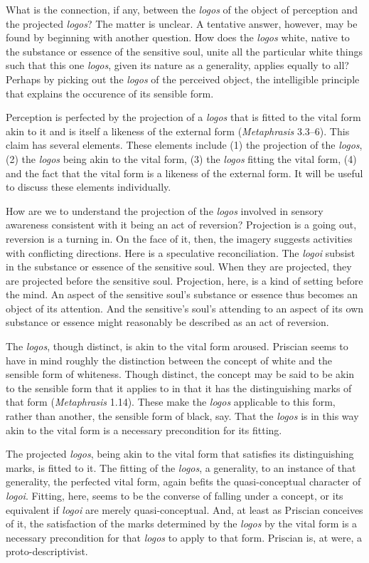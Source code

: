 \documentclass[12pt]{article}
\begin{document}
What is the connection, if any, between the \emph{logos} of the object of perception and the projected \emph{logos}? The matter is unclear. A tentative answer, however, may be found by beginning with another question. How does the \emph{logos} white, native to the substance or essence of the sensitive soul, unite all the particular white things such that this one \emph{logos}, given its nature as a generality, applies equally to all? Perhaps by picking out the \emph{logos} of the perceived object, the intelligible principle that explains the occurence of its sensible form.

Perception is perfected by the projection of a \emph{logos} that is fitted to the vital form akin to it and is itself a likeness of the external form (\emph{Metaphrasis} 3.3--6). This claim has several elements. These elements include (1) the projection of the \emph{logos}, (2) the \emph{logos} being akin to the vital form, (3) the \emph{logos} fitting the vital form, (4) and the fact that the vital form is a likeness of the external form. It will be useful to discuss these elements individually.

How are we to understand the projection of the \emph{logos} involved in sensory awareness consistent with it being an act of reversion? Projection is a going out, reversion is a turning in. On the face of it, then, the imagery suggests activities with conflicting directions. Here is a speculative reconciliation. The \emph{logoi} subsist in the substance or essence of the sensitive soul. When they are projected, they are projected before the sensitive soul. Projection, here, is a kind of setting before the mind. An aspect of the sensitive soul's substance or essence thus becomes an object of its attention. And the sensitive's soul's attending to an aspect of its own substance or essence might reasonably be described as an act of reversion.

The \emph{logos}, though distinct, is akin to the vital form aroused. Priscian seems to have in mind roughly the distinction between the concept of white and the sensible form of whiteness. Though distinct, the concept may be said to be akin to the sensible form that it applies to in that it has the distinguishing marks of that form (\emph{Metaphrasis} 1.14). These make the \emph{logos} applicable to this form, rather than another, the sensible form of black, say. That the \emph{logos} is in this way akin to the vital form is a necessary precondition for its fitting.

The projected \emph{logos}, being akin to the vital form that satisfies its distinguishing marks, is fitted to it. The fitting of the \emph{logos}, a generality, to an instance of that generality, the perfected vital form, again befits the quasi-conceptual character of \emph{logoi}. Fitting, here, seems to be the converse of falling under a concept, or its equivalent if \emph{logoi} are merely quasi-conceptual. And, at least as Priscian conceives of it, the satisfaction of the marks determined by the \emph{logos} by the vital form is a necessary precondition for that \emph{logos} to apply to that form. Priscian is, at were, a proto-descriptivist. 
\end{document}
